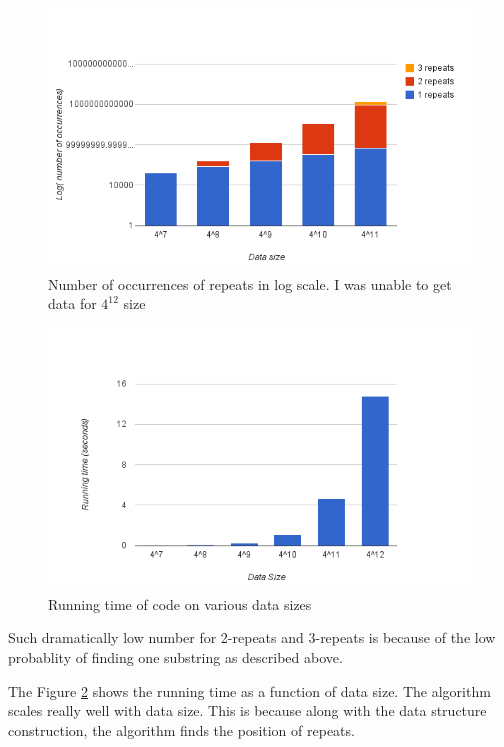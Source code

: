 \documentclass{article}
\begin{document}
\begin{figure}
		\centering
		\includegraphics[scale=0.5]{chart_1.png}
				\caption{Number of occurrences of repeats in log scale. I was unable to get data for $4^{12}$ size}
		\label{histogram}

\end{figure}

\begin{figure}
		\centering
		\includegraphics[scale=0.6]{chart_2.png}
		\caption{Running time of code on various data sizes}
		\label{runtime}
		
\end{figure}	
Such dramatically low number for 2-repeats and 3-repeats is because of the low probablity of finding one substring as described above.


The Figure \ref{runtime} shows the running time as a function of data size. The algorithm scales really well with data size. This is because along with the data structure construction, the algorithm finds the position of repeats.
\end{document}

